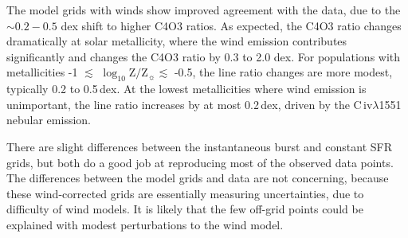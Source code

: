 \documentclass[preprint2,trackchanges]{aastex62}
\newcommand{\civ}{C\,{\sc iv}\xspace}
\newcommand{\logten}{\ensuremath{\log_{10}}}
\newcommand{\logz}{\ensuremath{\logten \mathrm{Z}/\mathrm{Z}_{\sun}}\xspace}
\begin{document}
The model grids with winds show improved agreement with the data, due to the $\sim0.2-0.5$ dex shift to higher C4O3 ratios. As expected, the C4O3 ratio changes dramatically at solar metallicity, where the wind emission contributes significantly and changes the C4O3 ratio by 0.3 to 2.0 dex. For populations with metallicities -1 $\lesssim$ \logz $\lesssim$ -0.5, the line ratio changes are more modest, typically 0.2 to 0.5\,dex. At the lowest metallicities where wind emission is unimportant, the line ratio increases by at most 0.2\,dex, driven by the \civ$\lambda$1551 nebular emission.

There are slight differences between the instantaneous burst and constant SFR grids, but both do a good job at reproducing most of the observed data points. The differences between the model grids and data are not concerning, because these wind-corrected grids are essentially measuring uncertainties, due to difficulty of wind models. It is likely that the few off-grid points could be explained with modest perturbations to the wind model.
\end{document}
